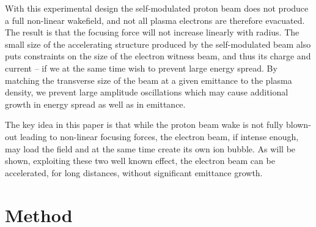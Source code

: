 \documentclass[aps,prstab,reprint,amsmath,amssymb,groupedaddress]{revtex4-1}
\newcommand{\unit}[1]{\,\mathrm{#1}}
\begin{document}
With this experimental design the self-modulated proton beam does not produce a full non-linear wakefield, and not all
plasma electrons are therefore evacuated. The result is that the focusing force will not increase linearly with radius.
The small size of the accelerating structure produced by the self-modulated beam also puts constraints on the size of
the electron witness beam, and thus its charge and current -- if we at the same time wish to prevent large energy
spread. By matching the transverse size of the beam at a given emittance to the plasma density, we prevent large
amplitude oscillations which may cause additional growth in energy spread as well as in emittance.

The key idea in this paper is that while the proton beam wake is not fully blown-out leading to non-linear focusing
forces, the electron beam, if intense enough, may load the field and at the same time create its own ion bubble. As will
be shown, exploiting these two well known effect, the electron beam can be accelerated, for long distances, without
significant emittance growth.


\section[\label{S:M}]{Method}
\end{document}
